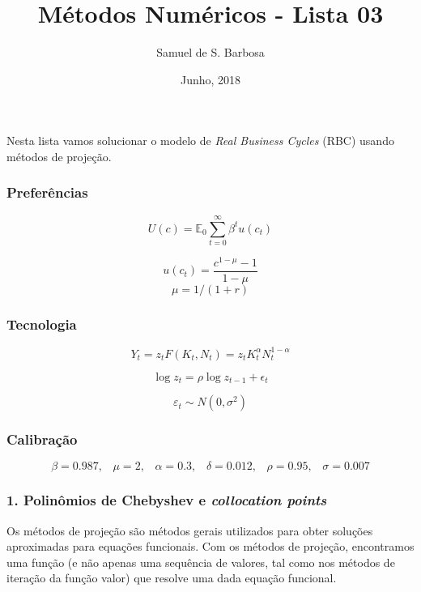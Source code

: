 \documentclass{article}
\title{Métodos Numéricos - Lista 03}
\author{Samuel de S. Barbosa}
\date{Junho, 2018}
\begin{document}
\maketitle

\section*{}

Nesta lista vamos solucionar o modelo de \textit{Real Business Cycles} (RBC) usando
métodos de projeção.


\subsubsection*{Preferências}

$$ U(c) = \mathbb{E}_0 \sum_{t=0}^{\infty} \beta^t u(c_t) $$

$$ u(c_t) = \frac{c^{1-\mu}-1}{1-\mu}$$
$$\mu = 1/(1+r)$$

\subsubsection*{Tecnologia}

$$Y_t = z_t F(K_t, N_t) = z_t K_t^\alpha N_t^{1-\alpha}$$

$$ \log z_t = \rho \log z_{t-1} + \epsilon_t $$

$$ \varepsilon_t \sim N(0, \sigma^2) $$

\subsubsection*{Calibração}

$$\beta = 0.987, \,\,\,\,\, \mu=2, \,\,\,\,\,  \alpha=0.3, \,\,\,\,\,  \delta=0.012, \,\,\,\,\,  \rho=0.95, \,\,\,\,\, \sigma=0.007$$

\newpage


\subsubsection*{1. Polinômios de Chebyshev e \textit{collocation points}}

Os métodos de projeção são métodos gerais utilizados para obter soluções
aproximadas para equações funcionais. Com os métodos de projeção,
encontramos uma função (e não apenas uma sequência de valores, tal como
nos métodos de iteração da função valor) que resolve uma dada equação funcional.
\end{document}
